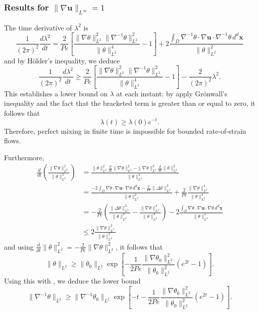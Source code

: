 \documentclass[12pt]{iopart}
\newcommand{\ddt}[1]{\frac{d #1}{dt}}
\newcommand{\hmone}[1]{\|\nabla^{-1} #1\|_{L^{2}}}
\newcommand{\ltwo}[1]{\|#1\|_{L^{2}}}
\newcommand{\hone}[1]{\| \nabla #1\|_{L^{2}}}
\newcommand{\sint}[1]{\int_{D} #1 \, d^{d}\mathbf{x}}
\renewcommand{\vec}[1]{\mathbf{#1}}
\newcommand{\linf}[1]{\| #1 \|_{L^{\infty}}}
\begin{document}
\label{sec:linfty_flows}
\subsubsection{Results for $\linf{\nabla \vec{u}} = 1$}

The time derivative of $\lambda^2$ is
%
\begin{equation*}
	\frac{1}{(2\pi)^2}\ddt{\lambda^2} = \frac{2}{Pe}
		\left[ 
			\frac{\hone{\theta}^2\hmone{\theta}^2}
					{\ltwo{\theta}^4}  
			- 1
		\right]
		+ 2 \frac{\sint{\nabla^{-1}\theta \cdot \nabla\vec{u} \cdot 
							\nabla^{-1}\theta  }}
					  {\ltwo{\theta}^{2}}
\end{equation*}
and by H\"older's inequality, we deduce
\begin{equation*}
\label{eq:length_ineq_rate-of-strain}
	\frac{1}{(2\pi)^2}\ddt{\lambda^2} \geq \frac{2}{Pe} \left[ 
			\frac{\hone{\theta}^2\hmone{\theta}^2}
					{\ltwo{\theta}^4}  
			- 1
		\right] - \frac{2}{(2\pi)^2}  \lambda^2 .
\end{equation*}
This establishes a lower bound on $\lambda$ at each instant: by apply Gr\"onwall's inequality and the fact that the bracketed term is greater than or equal to zero, it follows that
%
\begin{equation}
\label{eq:exponential_enstrophy}
	\lambda (t) \geq \lambda(0)e^{- t}.
\end{equation}
%
Therefore, perfect mixing in finite time is impossible for bounded rate-of-strain flows.

Furthermore,
%
 \begin{eqnarray*}
\frac{d}{dt}\left(\frac{\|\nabla\theta\|_{L^{2}}^2}{\|\theta\|_{L^{2}}^2}\right) &= \frac{\|\theta\|_{L^{2}}^2\frac{d}{dt}\|\nabla\theta\|_{L^{2}}^2-\|\nabla\theta\|_{L^{2}}^2\frac{d}{dt}\|\theta\|_{L^{2}}^2}{\|\theta\|_{L^{2}}^4}\\
&= \frac{-2\sint{\nabla\theta \cdot \nabla\vec{u} \cdot \nabla\theta  } - \frac{2}{Pe} \|\Delta\theta\|_{L^{2}}^2}{\|\theta\|_{L^{2}}^2}+\frac{2}{Pe}\frac{\|\nabla\theta\|_{L^{2}}^4}{\|\theta\|_{L^{2}}^4} \\
&=-\frac{2}{Pe}\left(\frac{\|\Delta\theta\|_{L^{2}}^2}{\|\theta\|_{L^{2}}^2} - \frac{\|\nabla\theta\|_{L^{2}}^4}{\|\theta\|_{L^{2}}^4} \right) - 2\frac{\sint{\nabla\theta \cdot \nabla\vec{u} \cdot \nabla\theta  }}{\|\theta\|_{L^{2}}^2} 
\\
&\leq 2 \frac{\hone{\theta}^2}{\ltwo{\theta}^2}
\end{eqnarray*}
and using $\ddt{}\ltwo{\theta}^2 = -\frac{2}{Pe} \hone{\theta}^2$, it follows that
\begin{equation}
\ltwo{\theta}\geq  \ltwo{\theta_{0}}\exp\left[-\frac{1}{2Pe}\frac{\hone{\theta_{0}}^2}{\ltwo{\theta_{0}}^2}\left(e^{2 t} -1\right)\right].
\end{equation}
Using this with , we deduce the lower bound
\begin{equation}
\hmone{\theta} \geq  \hmone{\theta_{0}} \exp\left[- t -\frac{1}{2 Pe}\frac{\hone{\theta_{0}}^2}{\ltwo{\theta_{0}}^2}\left(e^{2 t} -1\right)\right].
\end{equation}
\end{document}
